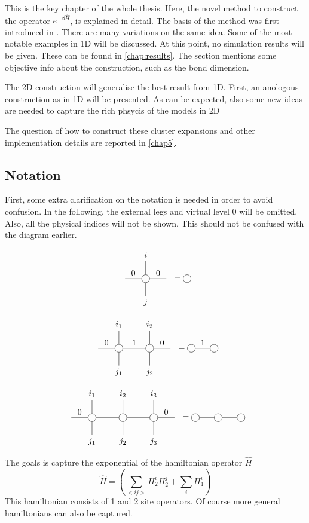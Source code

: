 This is the key chapter of the whole thesis. Here, the novel method to construct the operator $e^{-\beta \hat{H}}$, is explained in detail. The basis of the method was first introduced in \cite{Vanhecke2021}. There are many variations on the same idea. Some of the most notable examples in 1D will be discussed. At this point, no simulation results will be given. These can be found in \cref{chap:results}. The section mentions some objective info about the construction, such as the bond dimension.

The 2D construction will generalise the best result from 1D. First, an anologous construction as in 1D will be presented. As can be expected, also some new ideas are needed to capture the rich phsycis of the models in 2D

The question of how to construct these cluster expansions and other implementation details are reported in \cref{chap5}.

\subsection{Notation}

First, some extra clarification on the notation is needed in order to avoid confusion. In the following, the external legs and virtual level 0 will be omitted. Also, all the physical indices will not be shown. This should not be confused with the diagram earlier.

\begin{equation}
    \mpo{1}{ {0,0}  }{ {"$i$",}  }{ {"$j$",}}{}{{"",}} = \mpob{1}{ {0,0}  }{ {"$i$",}  }{ {"$j$",}}{}{{"",}}
\end{equation}

\begin{equation}
    \mpo{2}{ {0,1,0}  }{ {"$i_1$","$i_2$"}  }{ {"$j_1$","$j_2$",}}{}{{"",}} =\mpob{2}{ {0,1,0}  }{ {"$i_1$","$i_2$"}  }{ {"$j_1$","$j_1$",}}{}{{"",}}
\end{equation}

\begin{equation}
    \mpo{3}{ {0,,,0}  }{ {"$i_1$","$i_2$","$i_3$"}  }{ {"$j_1$","$j_2$","$j_3$"}}{}{{"",,}} =\mpob{3}{ {0,,,0}  }{}{}{}{{"",,}}
\end{equation}

The goals is capture the exponential of the hamiltonian operator $\hat{H}$
\begin{equation}
    \hat{H} = \left (  \sum_{<i j>} H^i_2 H^j_2 + \sum_i H^i_1 \right )
\end{equation}
This hamiltonian consists of 1 and 2 site operators. Of course more general hamiltonians can also be captured.

